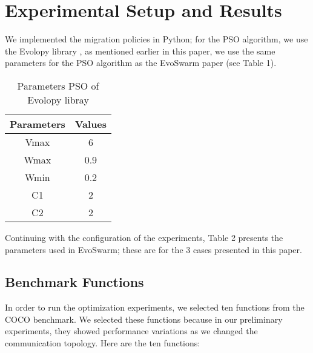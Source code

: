 \documentclass[runningheads]{llncs}
\begin{document}
\section{Experimental Setup and Results}

We implemented the migration policies in Python; for the PSO algorithm, we use
the Evolopy library \cite{b19}, as mentioned earlier in this paper, we use the
same parameters for the PSO algorithm as the EvoSwarm paper (see Table 1).



\begin{table}[h!]
\centering
\caption{Parameters PSO of Evolopy libray}
\begin{tabular}{|c c|} 
 \hline
 Parameters & Values  \\ [0.5ex] 
 \hline\hline
 Vmax & 6 \\ 
 Wmax & 0.9 \\
 Wmin & 0.2 \\
C1 & 2 \\
C2 & 2 \\[0.5ex]
 \hline
\end{tabular}
\label{table:1}
\end{table}

Continuing with the configuration of the experiments, Table 2 presents the
parameters used in EvoSwarm; these are for the 3 cases presented in this paper.

\begin{table}[h]
\centering
\caption{Parameters for EvoSwarm}
\label{table:1}
\end{table}

\subsection{Benchmark Functions}

In order to run the optimization experiments, we selected ten functions from the
COCO benchmark. We selected these functions because in our preliminary
experiments, they showed performance variations as we changed the communication
topology. Here are the ten functions:
\end{document}
